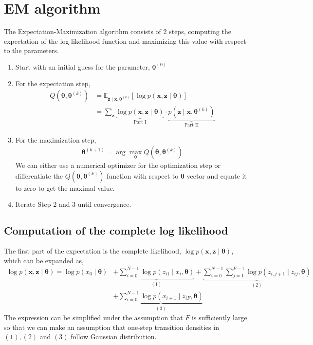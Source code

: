 \documentclass[12pt]{article}
\newcommand{\bx}{\ensuremath{\mathbf{x}}}
\newcommand{\bz}{\ensuremath{\mathbf{z}}}
\newcommand{\btheta}{\ensuremath{\boldsymbol{\theta}}}
\begin{document}
\section{EM algorithm}
The Expectation-Maximization algorithm consists of 2 steps, computing the expectation of the log likelihood function and maximizing this value with respect to the parameters.
\begin{enumerate}
\item Start with an initial guess for the parameter, $\btheta^{(0)}$
\item For the expectation step,
\begin{align}
\label{eqn:expectation}
Q(\btheta, \btheta^{(k)}) & = \mathbb{E}_{\bz \mid \bx, \btheta^{(k)}} [\log p(\bx, \bz \mid \btheta)] \\
& = \sum_{\bz} \underbrace{\log p(\bx, \bz \mid \btheta)}_{\text{Part I}} \cdot \underbrace{p(\bz \mid \bx, \btheta^{(k)})}_{\text{Part II}}
\end{align}
\item For the maximization step,
\begin{align}
\label{eqn:maximization}
\btheta^{(k+1)} = \arg \max_{\btheta} Q(\btheta, \btheta^{(k)}) 
\end{align}
We can either use a numerical optimizer for the optimization step or differentiate the $Q(\btheta, \btheta^{(k)})$ function with respect to $\btheta$ vector and equate it to zero to get the maximal value.
\item Iterate Step 2 and 3 until convergence.
\end{enumerate}

\subsection{Computation of the complete log likelihood}
The first part of the expectation is the complete likelihood, $\log p(\bx, \bz \mid \btheta)$, which can be expanded as,
\begin{align}
\label{eqn:loglik}
\log p(\bx, \bz \mid \btheta) = \log p(x_0 \mid \btheta) & + \underbrace{\sum_{i=0}^{N-1} \log p(z_{i1} \mid x_i, \btheta)}_{(1)} + \underbrace{\sum_{i=0}^{N-1} \sum_{j=1}^{F-1} \log p(z_{i,j+1} \mid z_{ij}, \btheta)}_{(2)} \\ 
& + \underbrace{\sum_{i=0}^{N-1} \log p(x_{i+1} \mid z_{iF}, \btheta)}_{(3)}
\end{align}
The expression can be simplified under the assumption that $F$ is sufficiently large so that we can make an assumption that one-step transition densities in $(1), (2)$ and $(3)$ follow Gaussian distribution.
\end{document}
